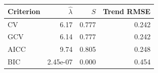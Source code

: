 \begin{tabular}{lrrr}
\hline
Criterion & $\widehat\lambda$ & $S$ & Trend RMSE \\
\hline
CV & 6.17 & 0.777 & 0.242 \\
GCV & 6.14 & 0.777 & 0.242 \\
AICC & 9.74 & 0.805 & 0.248 \\
BIC & 2.45e-07 & 0.000 & 0.454 \\
\hline
\end{tabular}
